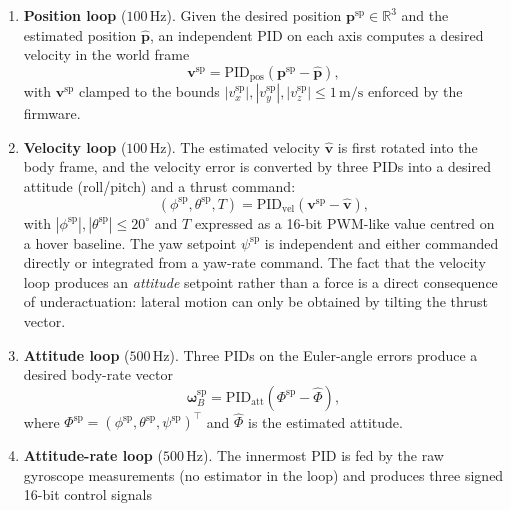 \documentclass[11pt,a4paper]{article}
\theoremstyle{remark}
\numberwithin{equation}{section}
\begin{document}
\begin{enumerate}
    \item \textbf{Position loop} ($100\,\mathrm{Hz}$). Given the desired position
    $\mathbf{p}^{\mathrm{sp}} \in \mathbb{R}^3$ and the estimated position
    $\hat{\mathbf{p}}$, an independent PID on each axis computes a desired velocity in the
    world frame
    \begin{equation}
    \mathbf{v}^{\mathrm{sp}} = \mathrm{PID}_{\mathrm{pos}}\!\left(\mathbf{p}^{\mathrm{sp}}
    - \hat{\mathbf{p}}\right),
    \end{equation}
    with $\mathbf{v}^{\mathrm{sp}}$ clamped to the bounds
    $|v_x^{\mathrm{sp}}|, |v_y^{\mathrm{sp}}|, |v_z^{\mathrm{sp}}| \le 1\,\mathrm{m/s}$
    enforced by the firmware.
    \item \textbf{Velocity loop} ($100\,\mathrm{Hz}$). The estimated velocity
    $\hat{\mathbf{v}}$ is first rotated into the body frame, and the velocity error is
    converted by three PIDs into a desired attitude (roll/pitch) and a thrust command:
    \begin{equation}
    (\phi^{\mathrm{sp}}, \theta^{\mathrm{sp}}, T) = \mathrm{PID}_{\mathrm{vel}}\!\left(
    \mathbf{v}^{\mathrm{sp}} - \hat{\mathbf{v}}\right),
    \end{equation}
    with $|\phi^{\mathrm{sp}}|, |\theta^{\mathrm{sp}}| \le 20^\circ$ and $T$ expressed as a
    16-bit PWM-like value centred on a hover baseline. The yaw setpoint $\psi^{\mathrm{sp}}$
    is independent and either commanded directly or integrated from a yaw-rate command. The
    fact that the velocity loop produces an \emph{attitude} setpoint rather than a force is
    a direct consequence of underactuation: lateral motion can only be obtained by tilting
    the thrust vector.
    \item \textbf{Attitude loop} ($500\,\mathrm{Hz}$). Three PIDs on the Euler-angle errors
    produce a desired body-rate vector
    \begin{equation}
    \boldsymbol{\omega}_B^{\mathrm{sp}} = \mathrm{PID}_{\mathrm{att}}\!\left(
    \Phi^{\mathrm{sp}} - \hat{\Phi}\right),
    \end{equation}
    where $\Phi^{\mathrm{sp}} = (\phi^{\mathrm{sp}}, \theta^{\mathrm{sp}}, \psi^{\mathrm{sp}})^\top$
    and $\hat{\Phi}$ is the estimated attitude.
    \item \textbf{Attitude-rate loop} ($500\,\mathrm{Hz}$). The innermost PID is fed by the
    raw gyroscope measurements (no estimator in the loop) and produces three signed
    16-bit control signals

\end{enumerate}
\end{document}
